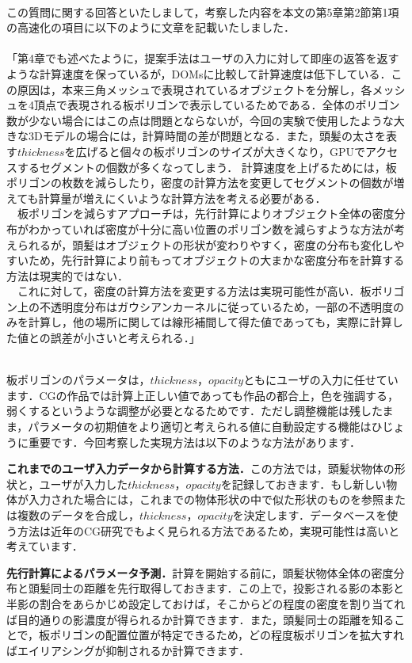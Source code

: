 \begin{qanda}
\item {}\\
この質問に関する回答といたしまして，考察した内容を本文の第5章第2節第1項の高速化の項目に以下のように文章を記載いたしました．\\
\\
「第4章でも述べたように，提案手法はユーザの入力に対して即座の返答を返すような計算速度を保っているが，DOMsに比較して計算速度は低下している．この原因は，本来三角メッシュで表現されているオブジェクトを分解し，各メッシュを4頂点で表現される板ポリゴンで表示しているためである．全体のポリゴン数が少ない場合にはこの点は問題とならないが，今回の実験で使用したような大きな3Dモデルの場合には，計算時間の差が問題となる．また，頭髪の太さを表す$thickness$を広げると個々の板ポリゴンのサイズが大きくなり，GPUでアクセスするセグメントの個数が多くなってしまう．
計算速度を上げるためには，板ポリゴンの枚数を減らしたり，密度の計算方法を変更してセグメントの個数が増えても計算量が増えにくいような計算方法を考える必要がある．\\
　板ポリゴンを減らすアプローチは，先行計算によりオブジェクト全体の密度分布がわかっていれば密度が十分に高い位置のポリゴン数を減らすような方法が考えられるが，頭髪はオブジェクトの形状が変わりやすく，密度の分布も変化しやすいため，先行計算により前もってオブジェクトの大まかな密度分布を計算する方法は現実的ではない．\\
　これに対して，密度の計算方法を変更する方法は実現可能性が高い．板ポリゴン上の不透明度分布はガウシアンカーネルに従っているため，一部の不透明度のみを計算し，他の場所に関しては線形補間して得た値であっても，実際に計算した値との誤差が小さいと考えられる．」
\newpage
\item {}\\
板ポリゴンのパラメータは，$thickness$，$opacity$ともにユーザの入力に任せています．CGの作品では計算上正しい値であっても作品の都合上，色を強調する，弱くするというような調整が必要となるためです．ただし調整機能は残したまま，パラメータの初期値をより適切と考えられる値に自動設定する機能はひじょうに重要です．今回考察した実現方法は以下のような方法があります．\par
\textbf{これまでのユーザ入力データから計算する方法．}この方法では，頭髪状物体の形状と，ユーザが入力した$thickness$，$opacity$を記録しておきます．もし新しい物体が入力された場合には，これまでの物体形状の中で似た形状のものを参照または複数のデータを合成し，$thickness$，$opacity$を決定します．データベースを使う方法は近年のCG研究でもよく見られる方法であるため，実現可能性は高いと考えています．\par
\textbf{先行計算によるパラメータ予測．}計算を開始する前に，頭髪状物体全体の密度分布と頭髪同士の距離を先行取得しておきます．この上で，投影される影の本影と半影の割合をあらかじめ設定しておけば，そこからどの程度の密度を割り当てれば目的通りの影濃度が得られるか計算できます．また，頭髪同士の距離を知ることで，板ポリゴンの配置位置が特定できるため，どの程度板ポリゴンを拡大すればエイリアシングが抑制されるか計算できます．


\end{qanda}
